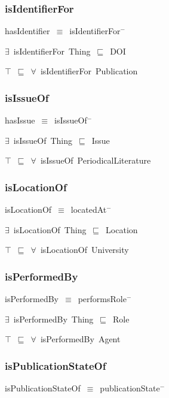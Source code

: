 \documentclass{article}
\begin{document}
\subsubsection*{isIdentifierFor}

hasIdentifier~\ensuremath{\equiv}~isIdentifierFor\ensuremath{^-}

\ensuremath{\exists}~isIdentifierFor~Thing~\ensuremath{\sqsubseteq}~DOI

\ensuremath{\top}~\ensuremath{\sqsubseteq}~\ensuremath{\forall}~isIdentifierFor~Publication

\subsubsection*{isIssueOf}

hasIssue~\ensuremath{\equiv}~isIssueOf\ensuremath{^-}

\ensuremath{\exists}~isIssueOf~Thing~\ensuremath{\sqsubseteq}~Issue

\ensuremath{\top}~\ensuremath{\sqsubseteq}~\ensuremath{\forall}~isIssueOf~PeriodicalLiterature

\subsubsection*{isLocationOf}

isLocationOf~\ensuremath{\equiv}~locatedAt\ensuremath{^-}

\ensuremath{\exists}~isLocationOf~Thing~\ensuremath{\sqsubseteq}~Location

\ensuremath{\top}~\ensuremath{\sqsubseteq}~\ensuremath{\forall}~isLocationOf~University

\subsubsection*{isPerformedBy}

isPerformedBy~\ensuremath{\equiv}~performsRole\ensuremath{^-}

\ensuremath{\exists}~isPerformedBy~Thing~\ensuremath{\sqsubseteq}~Role

\ensuremath{\top}~\ensuremath{\sqsubseteq}~\ensuremath{\forall}~isPerformedBy~Agent

\subsubsection*{isPublicationStateOf}

isPublicationStateOf~\ensuremath{\equiv}~publicationState\ensuremath{^-}
\end{document}
